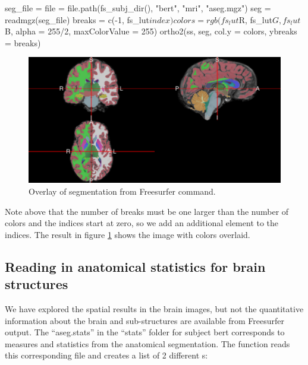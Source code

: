 \begin{Schunk}
\begin{Sinput}
seg_file = file = file.path(fs_subj_dir(), "bert", "mri", "aseg.mgz")
seg = readmgz(seg_file)
breaks = c(-1, fs_lut$index)
colors = rgb(fs_lut$R, fs_lut$G, fs_lut$B, alpha = 255/2, maxColorValue = 255)
ortho2(ss, seg, col.y = colors, ybreaks = breaks)
\end{Sinput}
\end{Schunk}

\begin{Schunk}
\begin{figure}
\includegraphics{Freesurfer_files/figure-latex/seg_file-1} \caption[Overlay of segmentation from Freesurfer  command]{Overlay of segmentation from Freesurfer  command.  }\label{fig:seg_file}
\end{figure}
\end{Schunk}

Note above that the number of breaks must be one larger than the number
of colors and the indices start at zero, so we add an additional element
to the indices. The result in figure \ref{fig:seg_file} shows the image
with colors overlaid.

\subsection{Reading in anatomical statistics for brain
structures}\label{reading-in-anatomical-statistics-for-brain-structures}

We have explored the spatial results in the brain images, but not the
quantitative information about the brain and sub-structures are
available from Freesurfer output. The ``aseg.stats'' in the ``stats''
folder for subject bert corresponds to measures and statistics from the
anatomical segmentation. The  function reads
this corresponding file and creates a list of 2 different
s:

